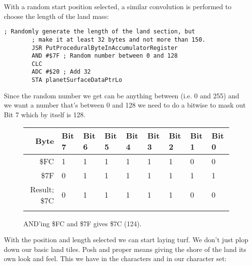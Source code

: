 With a random start position selected, a similar convolution is performed to choose the length of the land mass:

\begin{lstlisting}[caption=A convolution.]
        ; Randomly generate the length of the land section, but
        ; make it at least 32 bytes and not more than 150.
        JSR PutProceduralByteInAccumulatorRegister
        AND #$7F ; Random number between 0 and 128
        CLC
        ADC #$20 ; Add 32
        STA planetSurfaceDataPtrLo

\end{lstlisting}

Since the random number we get can be anything between  (i.e. 0 and 255) and we want a number
that's between 0 and 128 we need to do a bitwise  to mask out Bit 7 which by itself is 128.

\begin{figure}[H]
  {
    \setlength{\tabcolsep}{3.0pt}
    \setlength\cmidrulewidth{\heavyrulewidth} %
    \begin{adjustbox}{width=10cm,center}

      \begin{tabular}{rllllllll}
        \toprule
        Byte & Bit 7 & Bit 6 & Bit 5 & Bit 4 & Bit 3 & Bit 2 & Bit 1 & Bit 0        \\
        \midrule
        \$FC & 1 & 1 & 1 & 1 & 1 & 1 & 0 & 0 \\
        \$7F & 0 & 1 & 1 & 1 & 1 & 1 & 1 & 1 \\
        \midrule
        Result; \$7C & 0 & 1 & 1 & 1 & 1 & 1 & 0 & 0 \\
        \addlinespace
        \bottomrule
      \end{tabular}

    \end{adjustbox}

  }\caption*{AND'ing \$FC and \$7F gives \$7C (124).}
\end{figure}

With the position and length selected we can start laying turf. We don't just plop down our basic land tiles. Posh
and proper means giving the shore of the land its own look and feel. This we have in the characters  and
 in our character set: 

